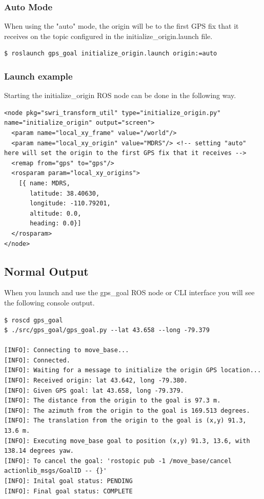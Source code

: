 \documentclass[runningheads,a4paper]{llncs}
\begin{document}
\subsubsection*{Auto Mode}
When using the "auto" mode, the origin will be to the first GPS fix that it receives on the topic configured in the initialize\_origin.launch file.
\begin{lstlisting}[frame=single,basicstyle=\ttfamily\footnotesize,breaklines=true]
$ roslaunch gps_goal initialize_origin.launch origin:=auto
\end{lstlisting}

\subsubsection*{Launch example}
Starting the initialize\_origin ROS node can be done in the following way.

\begin{lstlisting}[frame=single,basicstyle=\ttfamily\footnotesize,breaklines=true,caption={An example launch config to start the initialize\_origin ROS node.}]
<node pkg="swri_transform_util" type="initialize_origin.py" name="initialize_origin" output="screen">
  <param name="local_xy_frame" value="/world"/>
  <param name="local_xy_origin" value="MDRS"/> <!-- setting "auto" here will set the origin to the first GPS fix that it receives -->
  <remap from="gps" to="gps"/>
  <rosparam param="local_xy_origins">
    [{ name: MDRS,
       latitude: 38.40630,
       longitude: -110.79201,
       altitude: 0.0,
       heading: 0.0}]
  </rosparam>
</node>
\end{lstlisting}

\subsection{Normal Output}
When you launch and use the gps\_goal ROS node or CLI interface you will see the following console output.

\begin{lstlisting}[frame=single,basicstyle=\ttfamily\footnotesize,breaklines=true]
$ roscd gps_goal
$ ./src/gps_goal/gps_goal.py --lat 43.658 --long -79.379

[INFO]: Connecting to move_base...
[INFO]: Connected.
[INFO]: Waiting for a message to initialize the origin GPS location...
[INFO]: Received origin: lat 43.642, long -79.380.
[INFO]: Given GPS goal: lat 43.658, long -79.379.
[INFO]: The distance from the origin to the goal is 97.3 m.
[INFO]: The azimuth from the origin to the goal is 169.513 degrees.
[INFO]: The translation from the origin to the goal is (x,y) 91.3, 13.6 m.
[INFO]: Executing move_base goal to position (x,y) 91.3, 13.6, with 138.14 degrees yaw.
[INFO]: To cancel the goal: 'rostopic pub -1 /move_base/cancel actionlib_msgs/GoalID -- {}'
[INFO]: Inital goal status: PENDING
[INFO]: Final goal status: COMPLETE
\end{lstlisting}
\end{document}
